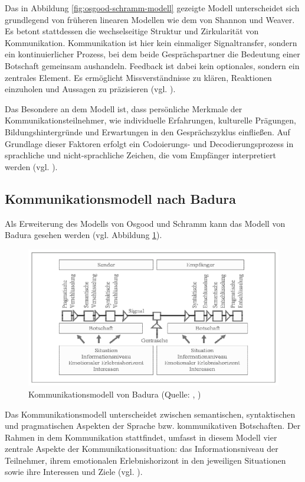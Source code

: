 Das in Abbildung \ref{fig:osgood-schramm-modell} gezeigte Modell unterscheidet sich grundlegend von früheren linearen Modellen wie dem von Shannon und Weaver. Es betont stattdessen die wechselseitige Struktur und Zirkularität von Kommunikation. Kommunikation ist hier kein einmaliger Signaltransfer, sondern ein kontinuierlicher Prozess, bei dem beide Gesprächspartner die Bedeutung einer Botschaft gemeinsam aushandeln. Feedback ist dabei kein optionales, sondern ein zentrales Element. Es ermöglicht Missverständnisse zu klären, Reaktionen einzuholen und Aussagen zu präzisieren (vgl. \citealp{noauthor_osgood_2024}). 

Das Besondere an dem Modell ist, dass persönliche Merkmale der Kommunikationsteilnehmer, wie individuelle Erfahrungen, kulturelle Prägungen, Bildungshintergründe und Erwartungen in den Gesprächszyklus einfließen. Auf Grundlage dieser Faktoren erfolgt ein Codoierungs- und Decodierungsprozess in sprachliche und nicht-sprachliche Zeichen, die vom Empfänger interpretiert werden (vgl. \citealp{noauthor_osgood_2024}). 

\subsection{Kommunikationsmodell nach Badura}
Als Erweiterung des Modells von Osgood und Schramm kann das Modell von Badura gesehen werden (vgl. Abbildung \ref{fig:badura-modell}).

\begin{figure}[ht]
\centering
\includegraphics[width=1\linewidth]{content/pictures/badura.PNG}
\caption{Kommunikationsmodell von Badura (Quelle: \cite{badura_kommunikation_1992}, \cite[S. 93]{scheufele_kommunikation_2007})}
\label{fig:badura-modell}
\end{figure}

Das Kommunikationsmodell unterscheidet zwischen semantischen, syntaktischen und pragmatischen Aspekten der Sprache bzw. kommunikativen Botschaften. Der Rahmen in dem Kommunikation stattfindet, umfasst in diesem Modell vier zentrale Aspekte der Kommunikationssituation: das Informationsniveau der Teilnehmer, ihrem emotionalen Erlebnishorizont in den jeweiligen Situationen sowie ihre Interessen und Ziele (vgl. \citealp[S. 93]{scheufele_kommunikation_2007}).

